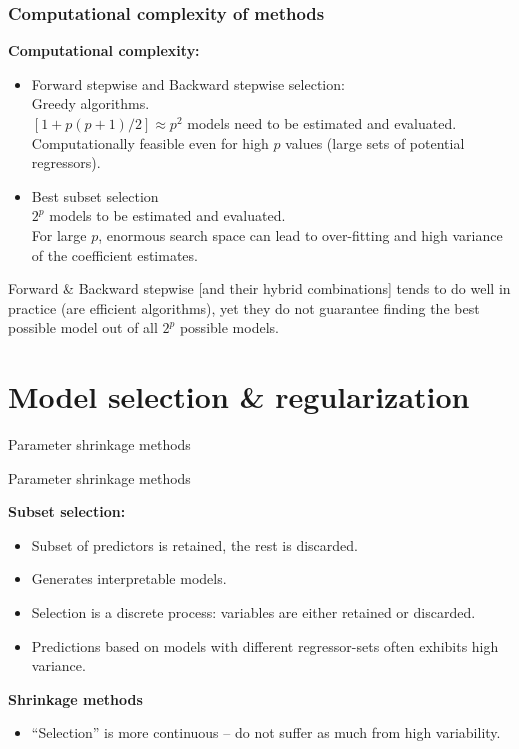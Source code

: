 \documentclass{beamer}
\begin{document}
\begin{frame}
\frametitle{Computational complexity of methods}

\textbf{Computational complexity:} 
\bigskip
\begin{itemize}
  \item Forward stepwise and Backward stepwise selection:
        \\ Greedy algorithms.
        \\$[1+p(p+1)/2] \approx p^2$ models need to be estimated and evaluated.
        \\Computationally feasible even for high $p$ values (large sets of potential regressors).
        \vspace{0.5cm}
  \item Best subset selection
        \\ $2^p$ models to be estimated and evaluated.
        \\ For large $p$, enormous search space can lead to over-fitting and high variance of the coefficient estimates.
\end{itemize}
\bigskip
Forward \& Backward stepwise [and their hybrid combinations] tends to do well in practice (are efficient algorithms), yet they do not guarantee finding the best possible model out of all $2^p$ possible models.
\end{frame}

\section{Model selection \& regularization}
\begin{frame}{Parameter shrinkage methods}
\end{frame}
\begin{frame}{Parameter shrinkage methods}

\textbf{Subset selection:} 
\begin{itemize}
\item Subset of predictors is retained, the rest is discarded.
\item Generates interpretable models. 
\item Selection is a discrete process: variables are either retained or discarded. \item Predictions based on models with different regressor-sets often exhibits high variance.
\end{itemize}
\medskip
\textbf{Shrinkage methods} 
\begin{itemize}
    \item ``Selection'' is more continuous -- do not suffer as much from high variability.
\end{itemize}
\end{frame}
\end{document}
